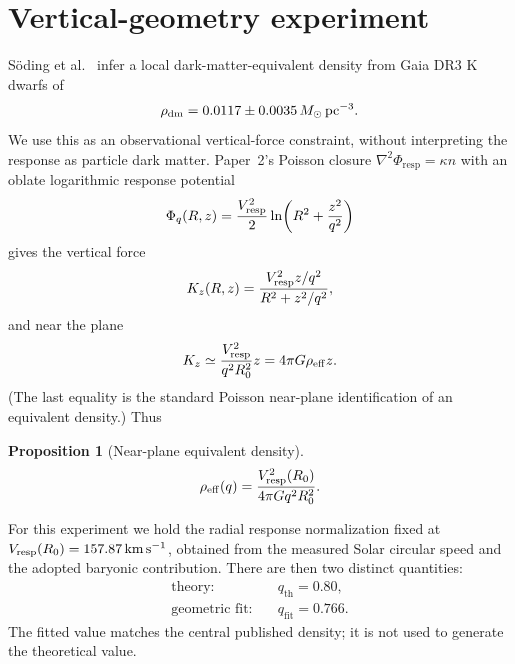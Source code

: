 \documentclass[11pt]{article}
\newtheorem{proposition}[theorem]{Proposition}
\theoremstyle{definition}
\theoremstyle{remark}
\newcommand{\Msun}{M_\odot}
\newcommand{\kms}{\mathrm{km\,s^{-1}}}
\newcommand{\qth}{q_{\mathrm{th}}}
\newcommand{\qfit}{q_{\mathrm{fit}}}
\begin{document}
\section{Vertical-geometry experiment}
\label{sec:vertical-exp}
S\"oding et al.~\cite{Soding2025} infer a local dark-matter-equivalent density from Gaia DR3 K dwarfs of
\begin{equation}
\rho_{\rm dm}=0.0117\pm0.0035\,\Msun\,\mathrm{pc}^{-3}.
\end{equation}
We use this as an observational vertical-force constraint, without interpreting the response as particle dark matter.
Paper~2's Poisson closure $\nabla^{2}\Phi_{\mathrm{resp}}=\kappa n$ with an oblate logarithmic response potential
\begin{equation}
\Phi_q(R,z)=\frac{V_{\rm resp}^2}{2}\ln\!\left(R^2+\frac{z^2}{q^2}\right)
\end{equation}
gives the vertical force
\begin{equation}
K_z(R,z)=\frac{V_{\rm resp}^2 z/q^2}{R^2+z^2/q^2},
\end{equation}
and near the plane
\begin{equation}
K_z\simeq\frac{V_{\rm resp}^2}{q^2R_0^2}z
=4\pi G\rho_{\rm eff}z.
\end{equation}
(The last equality is the standard Poisson near-plane identification of an equivalent density.)
Thus
\begin{proposition}[Near-plane equivalent density]
\label{prop:rho-eff}
\begin{equation}
\rho_{\rm eff}(q)=\frac{V_{\rm resp}^2(R_0)}{4\pi Gq^2R_0^2}.
\end{equation}
\end{proposition}
For this experiment we hold the radial response normalization fixed at $V_{\rm resp}(R_0)=157.87\,\kms$, obtained from the measured Solar circular speed and the adopted baryonic contribution.
There are then two distinct quantities:
\begin{align}
\text{theory:}\quad&\qth=0.80,\\
\text{geometric fit:}\quad&\qfit=0.766.
\end{align}
The fitted value matches the central published density; it is not used to generate the theoretical value.
\end{document}
